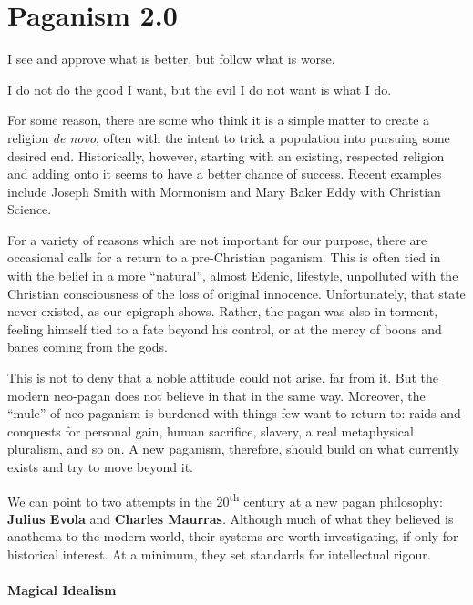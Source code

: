 \section{Paganism 2.0}

\begin{quotex}
I see and approve what is better, but follow what is worse.

I do not do the good I want, but the evil I do not want is what I do.
\end{quotex}


For some reason, there are some who think it is a simple matter to create a religion \emph{de novo}, often with the intent to trick a population into pursuing some desired end. Historically, however, starting with an existing, respected religion and adding onto it seems to have a better chance of success. Recent examples include Joseph Smith with Mormonism and Mary Baker Eddy with Christian Science.

For a variety of reasons which are not important for our purpose, there are occasional calls for a return to a pre-Christian paganism. This is often tied in with the belief in a more ``natural'', almost Edenic, lifestyle, unpolluted with the Christian consciousness of the loss of original innocence. Unfortunately, that state never existed, as our epigraph shows. Rather, the pagan was also in torment, feeling himself tied to a fate beyond his control, or at the mercy of boons and banes coming from the gods.

This is not to deny that a noble attitude could not arise, far from it. But the modern neo-pagan does not believe in that in the same way. Moreover, the ``mule'' of neo-paganism is burdened with things few want to return to: raids and conquests for personal gain, human sacrifice, slavery, a real metaphysical pluralism, and so on. A new paganism, therefore, should build on what currently exists and try to move beyond it.

We can point to two attempts in the 20\textsuperscript{th} century at a new pagan philosophy: \textbf{Julius Evola} and \textbf{Charles Maurras}. Although much of what they believed is anathema to the modern world, their systems are worth investigating, if only for historical interest. At a minimum, they set standards for intellectual rigour.

\paragraph{Magical Idealism}


